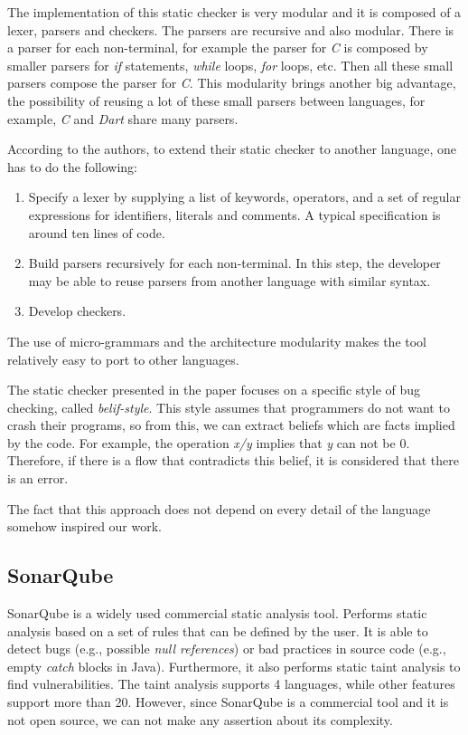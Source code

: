 The implementation of this static checker is very modular and it is composed of a lexer,  parsers and checkers. The parsers are recursive and also modular. There is a parser for each non-terminal, for example the parser for \textit{C} is composed by smaller parsers for \textit{if} statements, \textit{while} loops, \textit{for} loops, etc. Then all these small parsers compose the parser for \textit{C}. This modularity brings another big advantage, the possibility of reusing a lot of these small parsers between languages, for example, \textit{C} and \textit{Dart} share many parsers.

According to the authors, to extend their static checker to another language, one has to do the following: \begin{enumerate}
    \item Specify a lexer by supplying a list of keywords, operators, and a set of regular expressions for identifiers, literals and comments. A typical specification is around ten lines of code.

    \item Build parsers recursively for each non-terminal. In this step, the developer may be able to reuse parsers from another language with similar syntax.
    
    \item Develop checkers.
\end{enumerate} 

The use of micro-grammars and the architecture modularity makes the tool relatively easy to port to other languages.

The static checker presented in the paper focuses on a specific style of bug checking, called \textit{belif-style}. This style assumes that programmers do not want to crash their programs, so from this, we can extract beliefs which are facts implied by the code. For example, the operation \textit{x/y} implies that \textit{y} can not be 0. Therefore, if there is a flow that contradicts this belief, it is considered that there is an error.

The fact that this approach does not depend on every detail of the language somehow inspired our work.

\subsection{SonarQube}
SonarQube \cite{campbell2013sonarqube} is a widely used commercial static analysis tool. Performs static analysis based on a set of rules that can be defined by the user. It is able to detect bugs (e.g., possible \textit{null references}) or bad practices in source code (e.g., empty \textit{catch} blocks in Java). Furthermore, it also performs static taint analysis to find vulnerabilities. The taint analysis supports 4 languages, while other features support more than 20. However, since SonarQube is a commercial tool and it is not open source, we can not make any assertion about its complexity. 


